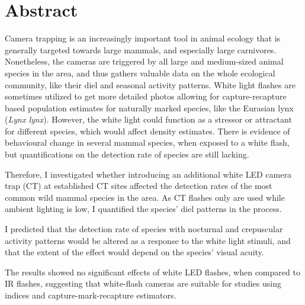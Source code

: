 \section*{Abstract}

Camera trapping is an increasingly important tool in animal ecology that is generally targeted towards large mammals, and especially large carnivores.
Nonetheless, the cameras are triggered by all large and medium-sized animal species in the area, and thus gathers valuable data on the whole ecological community, like their diel and seasonal activity patterns.
White light flashes are sometimes utilized to get more detailed photos allowing for capture-recapture based population estimates for naturally marked species, like the Eurasian lynx (\textit{Lynx lynx}).
However, the white light could function as a stressor or attractant for different species, which would affect density estimates. 
There is evidence of behavioural change in several mammal species, when exposed to a white flash, but quantifications on the detection rate of species are still lacking.

Therefore, I investigated whether introducing an additional white LED camera trap (CT) at established CT sites affected the detection rates of the most common wild mammal species in the area. As CT flashes only are used while ambient lighting is low, I quantified the species' diel patterns in the process.

I predicted that the detection rate of species with nocturnal and crepuscular activity patterns would be altered as a response to the white light stimuli, and that the extent of the effect would depend on the species' visual acuity. 

The results showed no significant effects of white LED flashes, when compared to IR flashes,
suggesting that white-flash cameras are suitable for studies using indices and capture-mark-recapture estimators. 

\thispagestyle{plain}



